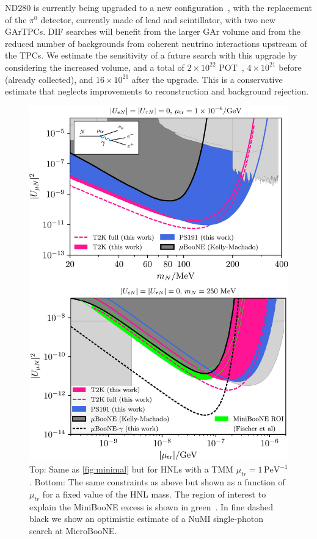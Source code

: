 \documentclass[
reprint,
superscriptaddress,
showpacs,
preprintnumbers,
bibnotes,
amsmath,
amssymb,
aps,
prd,
floatfix
]{revtex4-2}
\begin{document}
ND280 is currently being upgraded to a new configuration~\cite{T2K:2019bbb}, with the replacement of the $\pi^0$ detector, currently made of lead and scintillator, with two new GArTPCs.
DIF searches will benefit from the larger GAr volume and from the reduced number of backgrounds from coherent neutrino interactions upstream of the TPCs.
We estimate the sensitivity of a future search with this upgrade by considering the increased volume, and a total of $2\times 10^{22}$ POT~\cite{Abe:2016tii}, $4\times 10^{21}$ before (already collected), and $16\times 10^{21}$ after the upgrade.
This is a conservative estimate that neglects improvements to reconstruction and background rejection.
\begin{figure}[t]
    \centering
    \includegraphics[width=\columnwidth]{figures/Fig-2.pdf}
    \caption{Top: Same as \cref{fig:minimal} but for HNLs with a TMM $\mu_{tr} = 1 \,\text{PeV}^{-1}$.
    Bottom: The same constraints as above but shown as a function of $\mu_{tr}$ for a fixed value of the HNL mass. The region of interest to explain the MiniBooNE excess is shown in green~\cite{Fischer:2019fbw}. In fine dashed black we show an optimistic estimate of a NuMI single-photon search at MicroBooNE.
    }
    \label{fig:dipole}
\end{figure}
\end{document}
